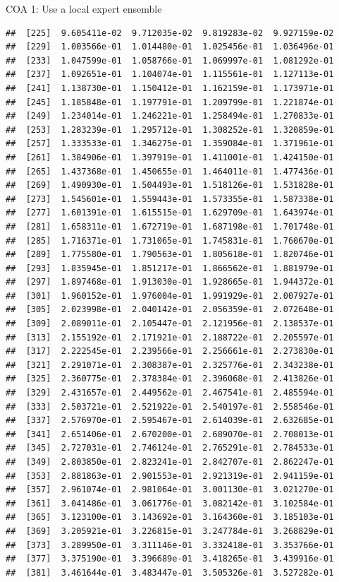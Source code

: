 \documentclass[ignorenonframetext,]{beamer}
\begin{document}
\begin{frame}[fragile]{COA 1: Use a local expert ensemble}
\begin{verbatim}
##  [225]  9.605411e-02  9.712035e-02  9.819283e-02  9.927159e-02
##  [229]  1.003566e-01  1.014480e-01  1.025456e-01  1.036496e-01
##  [233]  1.047599e-01  1.058766e-01  1.069997e-01  1.081292e-01
##  [237]  1.092651e-01  1.104074e-01  1.115561e-01  1.127113e-01
##  [241]  1.138730e-01  1.150412e-01  1.162159e-01  1.173971e-01
##  [245]  1.185848e-01  1.197791e-01  1.209799e-01  1.221874e-01
##  [249]  1.234014e-01  1.246221e-01  1.258494e-01  1.270833e-01
##  [253]  1.283239e-01  1.295712e-01  1.308252e-01  1.320859e-01
##  [257]  1.333533e-01  1.346275e-01  1.359084e-01  1.371961e-01
##  [261]  1.384906e-01  1.397919e-01  1.411001e-01  1.424150e-01
##  [265]  1.437368e-01  1.450655e-01  1.464011e-01  1.477436e-01
##  [269]  1.490930e-01  1.504493e-01  1.518126e-01  1.531828e-01
##  [273]  1.545601e-01  1.559443e-01  1.573355e-01  1.587338e-01
##  [277]  1.601391e-01  1.615515e-01  1.629709e-01  1.643974e-01
##  [281]  1.658311e-01  1.672719e-01  1.687198e-01  1.701748e-01
##  [285]  1.716371e-01  1.731065e-01  1.745831e-01  1.760670e-01
##  [289]  1.775580e-01  1.790563e-01  1.805618e-01  1.820746e-01
##  [293]  1.835945e-01  1.851217e-01  1.866562e-01  1.881979e-01
##  [297]  1.897468e-01  1.913030e-01  1.928665e-01  1.944372e-01
##  [301]  1.960152e-01  1.976004e-01  1.991929e-01  2.007927e-01
##  [305]  2.023998e-01  2.040142e-01  2.056359e-01  2.072648e-01
##  [309]  2.089011e-01  2.105447e-01  2.121956e-01  2.138537e-01
##  [313]  2.155192e-01  2.171921e-01  2.188722e-01  2.205597e-01
##  [317]  2.222545e-01  2.239566e-01  2.256661e-01  2.273830e-01
##  [321]  2.291071e-01  2.308387e-01  2.325776e-01  2.343238e-01
##  [325]  2.360775e-01  2.378384e-01  2.396068e-01  2.413826e-01
##  [329]  2.431657e-01  2.449562e-01  2.467541e-01  2.485594e-01
##  [333]  2.503721e-01  2.521922e-01  2.540197e-01  2.558546e-01
##  [337]  2.576970e-01  2.595467e-01  2.614039e-01  2.632685e-01
##  [341]  2.651406e-01  2.670200e-01  2.689070e-01  2.708013e-01
##  [345]  2.727031e-01  2.746124e-01  2.765291e-01  2.784533e-01
##  [349]  2.803850e-01  2.823241e-01  2.842707e-01  2.862247e-01
##  [353]  2.881863e-01  2.901553e-01  2.921319e-01  2.941159e-01
##  [357]  2.961074e-01  2.981064e-01  3.001130e-01  3.021270e-01
##  [361]  3.041486e-01  3.061776e-01  3.082142e-01  3.102584e-01
##  [365]  3.123100e-01  3.143692e-01  3.164360e-01  3.185103e-01
##  [369]  3.205921e-01  3.226815e-01  3.247784e-01  3.268829e-01
##  [373]  3.289950e-01  3.311146e-01  3.332418e-01  3.353766e-01
##  [377]  3.375190e-01  3.396689e-01  3.418265e-01  3.439916e-01
##  [381]  3.461644e-01  3.483447e-01  3.505326e-01  3.527282e-01

\end{verbatim}
\end{frame}
\end{document}
